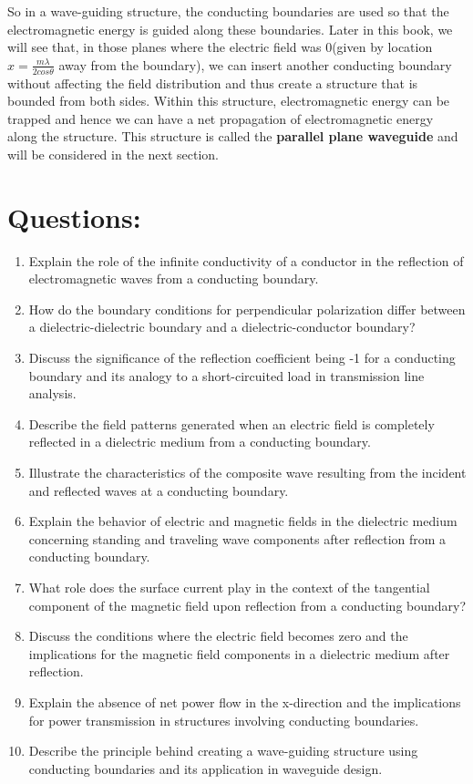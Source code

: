 So in a wave-guiding structure, the conducting boundaries are used so that the electromagnetic energy is guided along these boundaries. Later in this book, we will see that, in those planes where the electric field was $0$(given by location $x = \frac{m\lambda}{2cos\theta}$ away from the boundary), we can insert another conducting boundary without affecting the field distribution and thus create a structure that is bounded from both sides. Within this structure, electromagnetic energy can be trapped and hence we can have a net propagation of electromagnetic energy along the structure. This structure is called the \textbf{parallel plane waveguide}  and will be considered in the next section.


\section*{Questions:}
\begin{enumerate}
    \item Explain the role of the infinite conductivity of a conductor in the reflection of electromagnetic waves from a conducting boundary.
    \item How do the boundary conditions for perpendicular polarization differ between a dielectric-dielectric boundary and a dielectric-conductor boundary?
    \item Discuss the significance of the reflection coefficient being -1 for a conducting boundary and its analogy to a short-circuited load in transmission line analysis.
    \item Describe the field patterns generated when an electric field is completely reflected in a dielectric medium from a conducting boundary.
    \item Illustrate the characteristics of the composite wave resulting from the incident and reflected waves at a conducting boundary.
    \item Explain the behavior of electric and magnetic fields in the dielectric medium concerning standing and traveling wave components after reflection from a conducting boundary.
    \item What role does the surface current play in the context of the tangential component of the magnetic field upon reflection from a conducting boundary?
    \item Discuss the conditions where the electric field becomes zero and the implications for the magnetic field components in a dielectric medium after reflection.
    \item Explain the absence of net power flow in the x-direction and the implications for power transmission in structures involving conducting boundaries.
    \item Describe the principle behind creating a wave-guiding structure using conducting boundaries and its application in waveguide design.
\end{enumerate}
